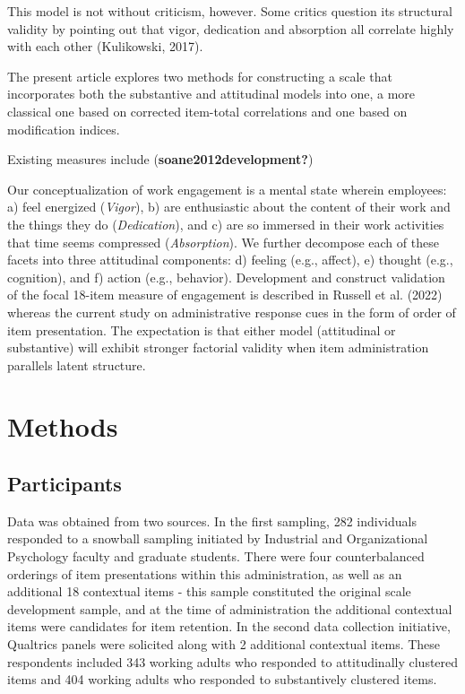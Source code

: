\documentclass[
  man]{apa7}
\begin{document}
This model is not without criticism, however. Some critics question its structural validity by pointing out that vigor, dedication and absorption all correlate highly with each other (Kulikowski, 2017).

The present article explores two methods for constructing a scale that incorporates both the substantive and attitudinal models into one, a more classical one based on corrected item-total correlations and one based on modification indices.

Existing measures include (\textbf{soane2012development?})

Our conceptualization of work engagement is a mental state wherein employees: a) feel energized (\emph{Vigor}), b) are enthusiastic about the content of their work and the things they do (\emph{Dedication}), and c) are so immersed in their work activities that time seems compressed (\emph{Absorption}). We further decompose each of these facets into three attitudinal components: d) feeling (e.g., affect), e) thought (e.g., cognition), and f) action (e.g., behavior). Development and construct validation of the focal 18-item measure of engagement is described in Russell et al. (2022) whereas the current study on administrative response cues in the form of order of item presentation. The expectation is that either model (attitudinal or substantive) will exhibit stronger factorial validity when item administration parallels latent structure.

\hypertarget{methods}{%
\section{Methods}\label{methods}}

\hypertarget{participants}{%
\subsection{Participants}\label{participants}}

Data was obtained from two sources. In the first sampling, 282 individuals responded to a snowball sampling initiated by Industrial and Organizational Psychology faculty and graduate students. There were four counterbalanced orderings of item presentations within this administration, as well as an additional 18 contextual items - this sample constituted the original scale development sample, and at the time of administration the additional contextual items were candidates for item retention. In the second data collection initiative, Qualtrics panels were solicited along with 2 additional contextual items. These respondents included 343 working adults who responded to attitudinally clustered items and 404 working adults who responded to substantively clustered items.
\end{document}
